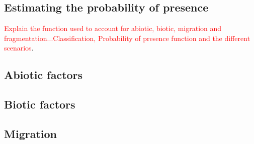 \documentclass[12pt]{article}
\newcommand{\carlos}[1]{\textcolor{Red}{#1}}
\begin{document}
\subsection{Estimating the probability of presence}

\carlos{Explain the function used to account for abiotic, biotic, migration and fragmentation...Classification, Probability of presence function and the different scenarios}. 


\subsection{Abiotic factors}

\subsection{Biotic factors}
 
\subsection{Migration}
\end{document}
